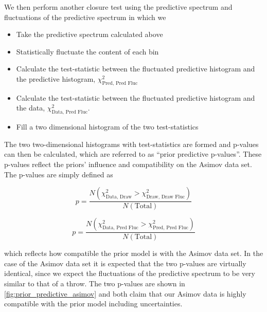 We then perform another closure test using the predictive spectrum and fluctuations of the predictive spectrum in which we
\begin{itemize}
	\item Take the predictive spectrum calculated above
	\item Statistically fluctuate the content of each \pmu \cosmu bin 
	\item Calculate the test-statistic between the fluctuated predictive histogram and the predictive histogram, $\chi^2_{\text{Pred, Pred Fluc}}$
	\item Calculate the test-statistic between the fluctuated predictive histogram and the data, $\chi^2_{\text{Data, Pred Fluc}}$.
	\item Fill a two dimensional histogram of the two test-statistics
\end{itemize}

The two two-dimensional histograms with test-statistics are formed and p-values can then be calculated, which are referred to as ``prior predictive p-values''.  These p-values reflect the priors' influence and compatibility on the Asimov data set. The p-values are simply defined as

\begin{equation}
p = \frac{N\left(\chi^2_{\text{Data, Draw}} > \chi^2_{\text{Draw, Draw Fluc}}\right)}{N\left(\text{Total}\right)}
\end{equation}

\begin{equation}
p = \frac{N\left(\chi^2_{\text{Data, Pred Fluc}} > \chi^2_{\text{Pred, Pred Fluc}}\right)}{N\left(\text{Total}\right)}
\end{equation}

which reflects how compatible the prior model is with the Asimov data set. In the case of the Asimov data set it is expected that the two p-values are virtually identical, since we expect the fluctuations of the predictive spectrum to be very similar to that of a throw.  The two p-values are shown in \autoref{fig:prior_predictive_asimov} and both claim that our Asimov data is  highly compatible with the prior model including uncertainties.

